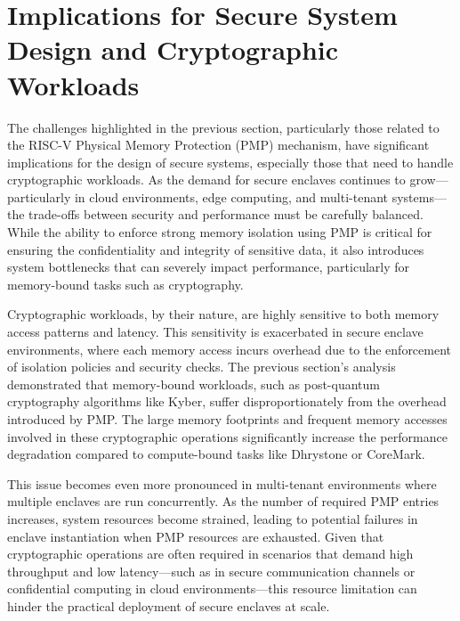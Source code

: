 \section{Implications for Secure System Design and Cryptographic Workloads}
\label{sec:implications}

The challenges highlighted in the previous section, particularly those related to the RISC-V Physical Memory Protection (PMP) mechanism, have significant implications for the design of secure systems, especially those that need to handle cryptographic workloads. As the demand for secure enclaves continues to grow—particularly in cloud environments, edge computing, and multi-tenant systems—the trade-offs between security and performance must be carefully balanced. While the ability to enforce strong memory isolation using PMP is critical for ensuring the confidentiality and integrity of sensitive data, it also introduces system bottlenecks that can severely impact performance, particularly for memory-bound tasks such as cryptography.

Cryptographic workloads, by their nature, are highly sensitive to both memory access patterns and latency. This sensitivity is exacerbated in secure enclave environments, where each memory access incurs overhead due to the enforcement of isolation policies and security checks. The previous section's analysis demonstrated that memory-bound workloads, such as post-quantum cryptography algorithms like Kyber, suffer disproportionately from the overhead introduced by PMP. The large memory footprints and frequent memory accesses involved in these cryptographic operations significantly increase the performance degradation compared to compute-bound tasks like Dhrystone or CoreMark.

This issue becomes even more pronounced in multi-tenant environments where multiple enclaves are run concurrently. As the number of required PMP entries increases, system resources become strained, leading to potential failures in enclave instantiation when PMP resources are exhausted. Given that cryptographic operations are often required in scenarios that demand high throughput and low latency—such as in secure communication channels or confidential computing in cloud environments—this resource limitation can hinder the practical deployment of secure enclaves at scale.

